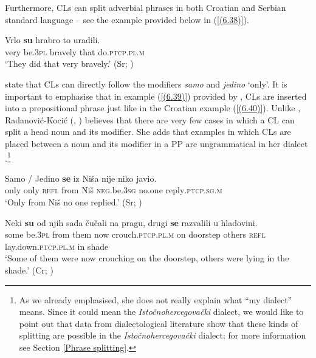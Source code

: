 Furthermore, CLs can split adverbial phrases in both Croatian and Serbian standard language – see the example provided below in (\ref{(6.38)}).

\begin{exe}\ex\label{(6.38)}
\gll Vrlo \textbf{su} hrabro to uradili.\\
 very be\textsc{.3pl} bravely that do\textsc{.ptcp.pl.m}\\
\glt ‘They did that very bravely.’ 
\hfill  (Sr; \citealt[450]{PiperKlajn14})
\end{exe}

\largerpage[2]
\noindent \citet[450]{PiperKlajn14} state that CLs can directly follow the modifiers \textit{samo} and \textit{jedino} ‘only’. It is important to emphasise that in example (\ref{(6.39)}) provided by \citet[450]{PiperKlajn14}, CLs are inserted into a prepositional phrase just like in the Croatian example (\ref{(6.40)}). Unlike \citet{PiperKlajn14}, Radanović-Kocić (\citeyear[114]{RadanovicKocic88}, \citeyear[436]{RadanovicKocic96}) believes that there are very few cases in which a CL can split a head noun and its modifier. She adds that examples in which CLs are placed between a noun and its modifier in a PP are ungrammatical in her dialect \citep[cf.][436]{RadanovicKocic96}.\footnote{As we already emphasised, she does not really explain what “my dialect” means. Since it could mean the \textit{Istočnohercegovački} dialect, we would like to point out that data from dialectological literature show that these kinds of splitting are possible in the \textit{Istočnohercegovački} dialect; for more information see Section \ref{Phrase splitting}.}

\begin{exe}\ex\label{(6.39)}
\gll Samo / Jedino \textbf{se} iz Niša nije niko javio.\\
 only {} only \textsc{refl} from Niš \textsc{neg.}be\textsc{.3sg} no.one reply\textsc{.ptcp.sg.m}\\
\glt ‘Only from Niš no one replied.’ 
\hfill  (Sr; \citealt[450]{PiperKlajn14})

\ex\label{(6.40)}
\gll Neki \textbf{su} od njih sada čučali na pragu, drugi \textbf{se} razvalili u hladovini. \\
 some be\textsc{.3pl} from them now crouch\textsc{.ptcp.pl.m} on doorstep others \textsc{refl} lay.down\textsc{.ptcp.pl.m} in shade \\
\glt ‘Some of them were now crouching on the doorstep, others were lying in the shade.’
\hfill  (Cr; \citealt[597]{Baric97})
\end{exe}

